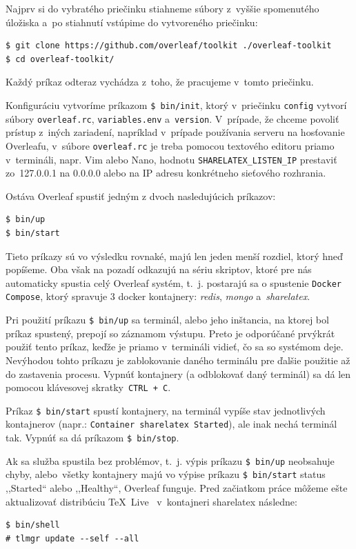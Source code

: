 \documentclass{csbulletin}
\begin{document}
Najprv si do vybratého priečinku stiahneme súbory z~vyššie spomenutého úložiska a~po stiahnutí vstúpime do vytvoreného priečinku:
\begin{lstlisting}
$ git clone https://github.com/overleaf/toolkit ./overleaf-toolkit
$ cd overleaf-toolkit/
\end{lstlisting}
Každý príkaz odteraz vychádza z~toho, že pracujeme v~tomto priečinku.

Konfiguráciu vytvoríme príkazom \lstinline{$ bin/init}, ktorý v~priečinku \texttt{config} vytvorí súbory \texttt{overleaf.rc}, \texttt{variables.env} a~\texttt{version}.
V~prípade, že chceme povoliť prístup z~iných zariadení, napríklad v~prípade používania serveru na hosťovanie Overleafu, v~súbore \texttt{overleaf.rc} je treba pomocou textového editoru priamo v~termináli, napr. Vim alebo Nano, hodnotu \texttt{SHARELATEX\_LISTEN\_IP} prestaviť zo~127.0.0.1 na 0.0.0.0 alebo na IP adresu konkrétneho sieťového rozhrania.

Ostáva Overleaf spustiť jedným z dvoch nasledujúcich príkazov:
\begin{lstlisting}
$ bin/up
$ bin/start
\end{lstlisting}
Tieto príkazy sú vo výsledku rovnaké, majú len jeden menší rozdiel, ktorý hneď popíšeme. Oba však na pozadí odkazujú na sériu skriptov, ktoré pre nás automaticky spustia celý Overleaf systém, t.~j. postarajú sa o spustenie \texttt{Docker Compose}, ktorý spravuje 3 docker kontajnery: \textit{redis}, \textit{mongo} a~\textit{sharelatex}.

Pri použití príkazu \lstinline{$ bin/up} sa terminál, alebo jeho inštancia, na ktorej bol príkaz spustený, prepojí so záznamom výstupu. Preto je odporúčané prvýkrát použiť tento príkaz, keďže je priamo v~termináli vidieť, čo sa so systémom deje. Nevýhodou tohto príkazu je zablokovanie daného terminálu pre ďalšie použitie až do zastavenia procesu. Vypnúť kontajnery (a odblokovať daný terminál) sa dá len pomocou klávesovej skratky~\verb|CTRL + C|.

Príkaz \lstinline{$ bin/start} spustí kontajnery, na terminál vypíše stav jednotlivých kontajnerov (napr.:  \lstinline{Container sharelatex Started}), ale inak nechá terminál tak. Vypnúť sa dá príkazom \lstinline{$ bin/stop}.

Ak sa služba spustila bez problémov, t.~j. výpis príkazu \lstinline{$ bin/up} neobsahuje chyby, alebo~všetky kontajnery majú vo výpise príkazu \lstinline{$ bin/start} status ,,Started`` alebo ,,Healthy``, Overleaf funguje.
Pred začiatkom práce môžeme ešte aktualizovať distribúciu \TeX~Live~\cite{texlive} v~kontajneri sharelatex následne:
\begin{lstlisting}
$ bin/shell
# tlmgr update --self --all
\end{lstlisting}
\end{document}
